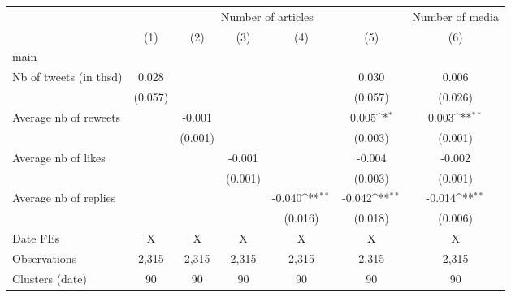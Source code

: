 {
\def\sym#1{\ifmmode^{#1}\else\(^{#1}\)\fi}
\begin{tabular}{l*{6}{c}}
\hline\hline
                    &\multicolumn{5}{c}{Number of articles}                                                                       &\multicolumn{1}{c}{Number of media}\\\cmidrule(lr){2-6}\cmidrule(lr){7-7}
                    &\multicolumn{1}{c}{(1)}         &\multicolumn{1}{c}{(2)}         &\multicolumn{1}{c}{(3)}         &\multicolumn{1}{c}{(4)}         &\multicolumn{1}{c}{(5)}         &\multicolumn{1}{c}{(6)}         \\
\hline
main                &                     &                     &                     &                     &                     &                     \\
Nb of tweets (in thsd)&       0.028         &                     &                     &                     &       0.030         &       0.006         \\
                    &     (0.057)         &                     &                     &                     &     (0.057)         &     (0.026)         \\
Average nb of reweets&                     &      -0.001         &                     &                     &       0.005\sym{*}  &       0.003\sym{**} \\
                    &                     &     (0.001)         &                     &                     &     (0.003)         &     (0.001)         \\
Average nb of likes &                     &                     &      -0.001         &                     &      -0.004         &      -0.002         \\
                    &                     &                     &     (0.001)         &                     &     (0.003)         &     (0.001)         \\
Average nb of replies&                     &                     &                     &      -0.040\sym{**} &      -0.042\sym{**} &      -0.014\sym{**} \\
                    &                     &                     &                     &     (0.016)         &     (0.018)         &     (0.006)         \\
\hline
Date FEs            &           X         &           X         &           X         &           X         &           X         &           X         \\
Observations        &       2,315         &       2,315         &       2,315         &       2,315         &       2,315         &       2,315         \\
Clusters (date)     &          90         &          90         &          90         &          90         &          90         &          90         \\
\hline\hline
\end{tabular}
}
